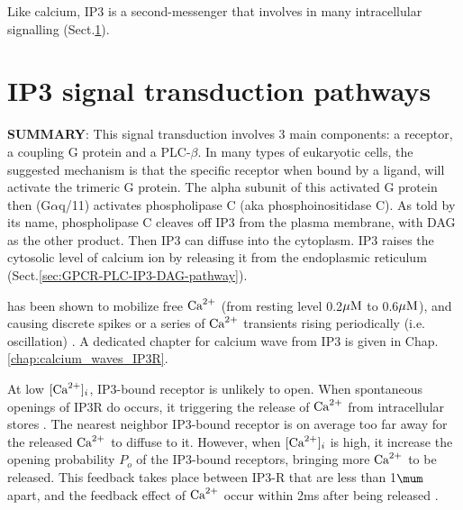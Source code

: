 Like calcium, IP3 is a second-messenger that involves in many intracellular
signalling (Sect.\ref{sec:ip3-pathways}).



\section{IP3 signal transduction pathways}
\label{sec:ip3-pathways}

{\bf SUMMARY}: This signal transduction involves 3 main components:
a receptor, a coupling G protein and a PLC-$\beta$. In many types of eukaryotic
cells, the suggested mechanism is that the specific receptor when bound by a
ligand, will activate the trimeric G protein. The alpha subunit of this
activated G protein then (G$\alpha$q/11) activates phospholipase C (aka
phosphoinositidase C). As told by its name, phospholipase C cleaves off IP3 from
the plasma membrane, with DAG as the other product. Then IP3 can diffuse into
the cytoplasm. IP3 raises the cytosolic level of calcium ion by releasing it from
the endoplasmic reticulum (Sect.\ref{sec:GPCR-PLC-IP3-DAG-pathway}).


\IPthree has been shown to mobilize free ${\text{Ca}^{2+}}$ (from resting level 0.2${\mu\text{M}}$ to
0.6${\mu\text{M}}$), and causing discrete spikes \citep{meyer1991} or a series of ${\text{Ca}^{2+}}$
transients rising periodically (i.e. oscillation) \citep{woods1987, dupont2000}.
A dedicated chapter for calcium wave from IP3 is given in
Chap.\ref{chap:calcium_waves_IP3R}.

At low $[{\text{Ca}^{2+}}]_i$, IP3-bound receptor is unlikely to open. When spontaneous
openings of IP3R do occurs, it triggering the release of ${\text{Ca}^{2+}}$ from
intracellular stores \citep{berridge1993}. The nearest neighbor IP3-bound
receptor is on average too far away for the released ${\text{Ca}^{2+}}$ to diffuse to it.
However, when $[{\text{Ca}^{2+}}]_i$ is high, it increase the opening probability $P_o$ of
the IP3-bound receptors, bringing more ${\text{Ca}^{2+}}$ to be released. This feedback takes
place between IP3-R that are less than 1$\mum$ apart, and the feedback effect of
${\text{Ca}^{2+}}$ occur within 2ms after being released \citep{wang1993lpf}.

